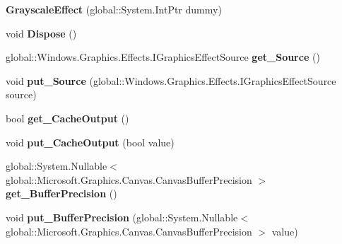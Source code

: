 \begin{DoxyCompactItemize}
{\bfseries Grayscale\+Effect} (global\+::\+System.\+Int\+Ptr dummy)
\item 
\mbox{\label{class_microsoft_1_1_graphics_1_1_canvas_1_1_effects_1_1_grayscale_effect_a7372dc109bbbb885617e2d79209b7c87}} 
void {\bfseries Dispose} ()
\item 
\mbox{\label{class_microsoft_1_1_graphics_1_1_canvas_1_1_effects_1_1_grayscale_effect_a2e2ee157a9b4c692f2f71f46fd3aa570}} 
global\+::\+Windows.\+Graphics.\+Effects.\+I\+Graphics\+Effect\+Source {\bfseries get\+\_\+\+Source} ()
\item 
\mbox{\label{class_microsoft_1_1_graphics_1_1_canvas_1_1_effects_1_1_grayscale_effect_aacc2139785cbbe136738db75ab05743c}} 
void {\bfseries put\+\_\+\+Source} (global\+::\+Windows.\+Graphics.\+Effects.\+I\+Graphics\+Effect\+Source source)
\item 
\mbox{\label{class_microsoft_1_1_graphics_1_1_canvas_1_1_effects_1_1_grayscale_effect_ad9db44f761fc7f92ebfa79cf4579cc69}} 
bool {\bfseries get\+\_\+\+Cache\+Output} ()
\item 
\mbox{\label{class_microsoft_1_1_graphics_1_1_canvas_1_1_effects_1_1_grayscale_effect_abb26ffcaefa0d98038ddcfbb61fd7fcc}} 
void {\bfseries put\+\_\+\+Cache\+Output} (bool value)
\item 
\mbox{\label{class_microsoft_1_1_graphics_1_1_canvas_1_1_effects_1_1_grayscale_effect_a7a345af04f7c903a4df1905044fff3aa}} 
global\+::\+System.\+Nullable$<$ global\+::\+Microsoft.\+Graphics.\+Canvas.\+Canvas\+Buffer\+Precision $>$ {\bfseries get\+\_\+\+Buffer\+Precision} ()
\item 
\mbox{\label{class_microsoft_1_1_graphics_1_1_canvas_1_1_effects_1_1_grayscale_effect_ac389a1f383b6df0b73a6977c64e0484e}} 
void {\bfseries put\+\_\+\+Buffer\+Precision} (global\+::\+System.\+Nullable$<$ global\+::\+Microsoft.\+Graphics.\+Canvas.\+Canvas\+Buffer\+Precision $>$ value)

\end{DoxyCompactItemize}
